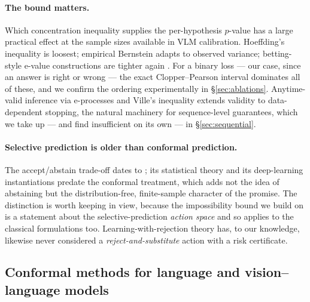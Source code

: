 \documentclass{article}
\theoremstyle{plain}
\theoremstyle{definition}
\theoremstyle{remark}
\begin{document}
\paragraph{The bound matters.}
Which concentration inequality supplies the per-hypothesis $p$-value has a large practical
effect at the sample sizes available in VLM calibration. Hoeffding's inequality is loosest;
empirical Bernstein adapts to observed variance; betting-style e-value constructions are
tighter again \citep{waudbysmith2024}. For a binary loss --- our case, since an answer is
right or wrong --- the exact Clopper--Pearson interval \citep{clopper1934} dominates all of
these, and we confirm the ordering experimentally in \S\ref{sec:ablations}. Anytime-valid
inference via e-processes and Ville's inequality \citep{waudbysmith2024,ramdas2023} extends
validity to data-dependent stopping, the natural machinery for sequence-level guarantees,
which we take up --- and find insufficient on its own --- in \S\ref{sec:sequential}.

\paragraph{Selective prediction is older than conformal prediction.}
The accept/abstain trade-off dates to \citet{chow1970}; its statistical theory
\citep{elyaniv2010,bartlett2008,cortes2016} and its deep-learning instantiations
\citep{geifman2019} predate the conformal treatment, which adds not the idea of abstaining
but the distribution-free, finite-sample character of the promise. The distinction is worth
keeping in view, because the impossibility bound we build on is a statement about the
selective-prediction \emph{action space} and so applies to the classical formulations too.
Learning-with-rejection theory has, to our knowledge, likewise never considered a
\emph{reject-and-substitute} action with a risk certificate.

\subsection{Conformal methods for language and vision--language models}
\label{sec:rel:conflm}
\end{document}
